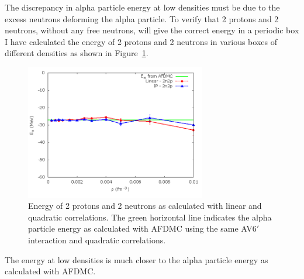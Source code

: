 The discrepancy in alpha particle energy at low densities must be due to the excess neutrons deforming the alpha particle. To verify that 2 protons and 2 neutrons, without any free neutrons, will give the correct energy in a periodic box I have calculated the energy of 2 protons and 2 neutrons in various boxes of different densities as shown in Figure~\ref{fig:alpha2n2p}.
\begin{figure}[h!]
   \centering
   \includegraphics[width=0.7\textwidth]{figures/2n2p.png}
   \caption[Energy of 2 Protons and 2 Neutrons as Calculated with Linear and Quadratic Correlations. The Green Horizontal Line Indicates the Alpha Particle Energy as Calculated with AFDMC Using the Same AV6$'$ Interaction and Quadratic Correlations.]{Energy of 2 protons and 2 neutrons as calculated with linear and quadratic correlations. The green horizontal line indicates the alpha particle energy as calculated with AFDMC using the same AV6$'$ interaction and quadratic correlations.}
   \label{fig:alpha2n2p}
\end{figure}
The energy at low densities is much closer to the alpha particle energy as calculated with AFDMC.

